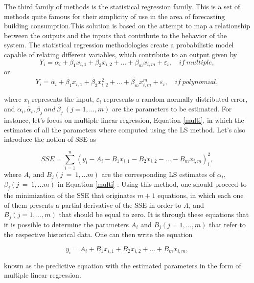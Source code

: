 The third family of methods is the statistical regression family. This is a set of methods quite famous for their simplicity of use in the area of forecasting building consumption.This solution is based on the attempt to map a relationship between the outputs and the inputs that contribute to the behavior of the system. The statistical regression methodologies create a probabilistic model capable of relating different variables, which contribute to an output given by 
\begin{equation}
       Y_i = \alpha_i + \beta_1 x_{i,1} + \beta_2 x_{i,2} + ... + \beta_m x_{i,m} + \varepsilon_i,\quad if \  multiple,
\label{multi}
\end{equation}
or
\begin{equation}
       Y_i = \tilde{\alpha_i} + \tilde{\beta_1} x_{i,1} + \tilde{\beta_2} x_{i,2}^2 + ... + \tilde{\beta_m} x_{i,m}^m + \varepsilon_i,\quad if \  polynomial,
\label{poly}
\end{equation}

where $x_i$ represents the input, $\varepsilon_i$ represents a random normally distributed error, and  $\alpha_i, \tilde{\alpha_i}, \beta_j\  and\  \tilde{\beta_j}\ (j=1,...,m)$ are the parameters to be estimated. For instance, let's focus on multiple linear regression, Equation \ref{multi}, in which the estimates of all the parameters where computed using the \ac{LS} method. Let's also introduce the notion of \ac{SSE} as

\begin{equation}
       SSE = \sum_{i=1}^n (y_i-A_i-B_1 x_{i,1} - B_2 x_{i,2} - ... - B_m x_{i,m})_i^2,
\label{SSE}
\end{equation}
 where $A_i$ and $B_j(j\ =\ 1,...m)$ are the corresponding \ac{LS} estimates of $\alpha_i$, $\beta_j(j\ =\ 1,...m)$ in Equation \ref{multi} \cite{review2017}. Using this method, one should proceed to the minimization of the SSE that originates $m+1$ equations, in which each one of them presents a partial derivative of the \ac{SSE} in order to $A_i$ and $B_j(j=1,...,m)$ that should be equal to zero. It is through these equations that it is possible to determine the parameters $A_i$ and $B_j(j=1,...,m)$ that refer to the respective historical data. One can then write the equation
 
\begin{equation}
       y_i = A_i + B_1 x_{i,1} +  B_2 x_{i,2} + ... + B_m x_{i,m},
\label{y_i}
\end{equation}

known as the predictive equation with the estimated parameters in the form of multiple linear regression.
 

